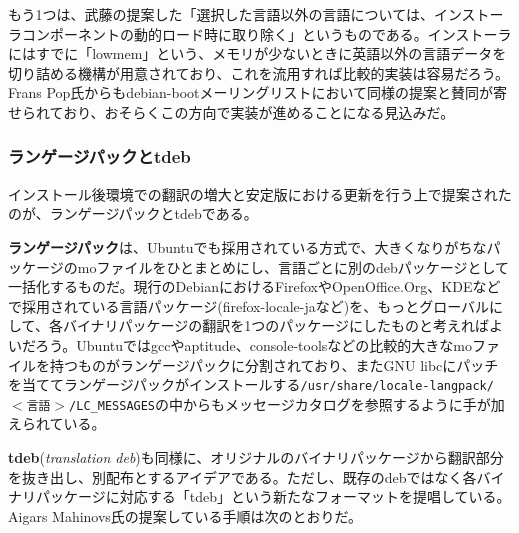 \documentclass[mingoth,a4paper]{jsarticle}
\begin{document}
もう1つは、武藤の提案した「選択した言語以外の言語については、インストーラコンポーネントの動的ロード時に取り除く」というものである。インストーラにはすでに「lowmem」という、メモリが少ないときに英語以外の言語データを切り詰める機構が用意されており、これを流用すれば比較的実装は容易だろう。Frans Pop氏からもdebian-bootメーリングリストにおいて同様の提案と賛同が寄せられており、おそらくこの方向で実装が進めることになる見込みだ。


\subsubsection{ランゲージパックとtdeb}
\label{sec:extremadura-langpack}

インストール後環境での翻訳の増大と安定版における更新を行う上で提案されたのが、ランゲージパックとtdebである。

\textbf{ランゲージパック}は、Ubuntuでも採用されている方式で、大きくなりがちなパッケージのmoファイルをひとまとめにし、言語ごとに別のdebパッケージとして一括化するものだ。現行のDebianにおけるFirefoxやOpenOffice.Org、KDEなどで採用されている言語パッケージ(firefox-locale-jaなど)を、もっとグローバルにして、各バイナリパッケージの翻訳を1つのパッケージにしたものと考えればよいだろう。Ubuntuではgccやaptitude、console-toolsなどの比較的大きなmoファイルを持つものがランゲージパックに分割されており、またGNU libcにパッチを当ててランゲージパックがインストールする\texttt{/usr/share/locale-langpack/$<$言語$>$/LC\_MESSAGES}の中からもメッセージカタログを参照するように手が加えられている。


\textbf{tdeb}(\emph{translation deb})も同様に、オリジナルのバイナリパッケージから翻訳部分を抜き出し、別配布とするアイデアである。ただし、既存のdebではなく各バイナリパッケージに対応する「tdeb」という新たなフォーマットを提唱している。Aigars Mahinovs氏の提案している手順は次のとおりだ。
\end{document}
